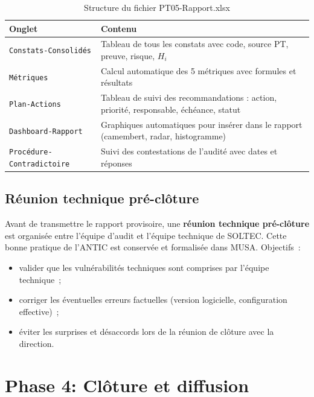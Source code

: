 \documentclass[12pt,a4paper,oneside]{report}
\begin{document}
\begin{table}[H]
	\centering\small
	\caption{Structure du fichier PT05-Rapport.xlsx}
	\label{tab:pt05}
	\begin{tabularx}{\textwidth}{p{4cm}X}
		\toprule
		\rowcolor{theadcolor}
		\color{white}\textbf{Onglet} &
		\color{white}\textbf{Contenu} \\
		\midrule
		\texttt{Constats-Consolidés} & Tableau de tous les constats avec code, source PT, preuve, risque, $H_i$ \\
		\texttt{Métriques} & Calcul automatique des 5 métriques avec formules et résultats \\
		\texttt{Plan-Actions} & Tableau de suivi des recommandations : action, priorité, responsable, échéance, statut \\
		\texttt{Dashboard-Rapport} & Graphiques automatiques pour insérer dans le rapport (camembert, radar, histogramme) \\
		\texttt{Procédure-Contradictoire} & Suivi des contestations de l'audité avec dates et réponses \\
		\bottomrule
	\end{tabularx}
\end{table}

\subsection{R\'eunion technique pr\'e-cl\^oture}

Avant de transmettre le rapport provisoire, une \textbf{r\'eunion technique
	pr\'e-cl\^oture} est organis\'ee entre l'\'equipe d'audit et l'\'equipe
technique de SOLTEC. Cette bonne pratique de l'ANTIC est conserv\'ee et
formalis\'ee dans MUSA. Objectifs~:

\begin{itemize}[label={\color{gold}}, leftmargin=*, itemsep=2pt]
	\item valider que les vuln\'erabilit\'es techniques sont comprises par
	l'\'equipe technique~;
	\item corriger les \'eventuelles erreurs factuelles (version logicielle,
	configuration effective)~;
	\item \'eviter les surprises et d\'esaccords lors de la r\'eunion de
	cl\^oture avec la direction.
\end{itemize}

\section{Phase 4: Cl\^oture et diffusion}
\label{sec:phase4}
\end{document}
